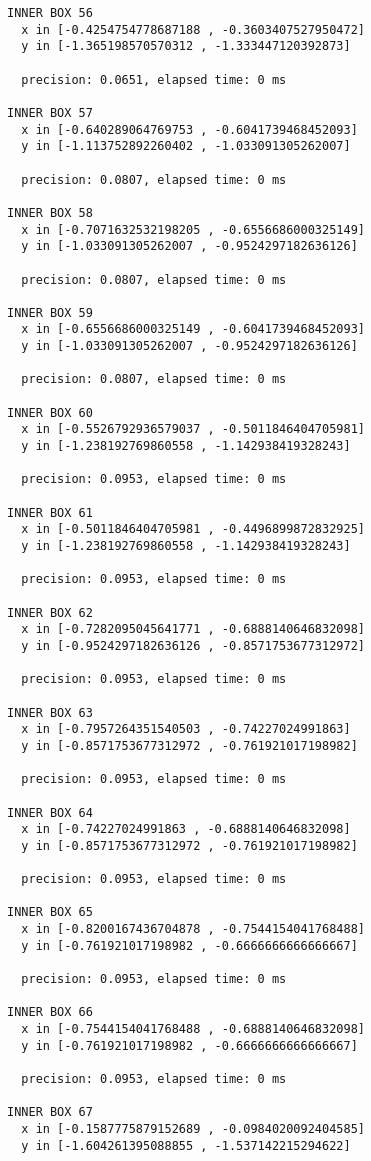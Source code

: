 \begin{verbatim}
INNER BOX 56
  x in [-0.4254754778687188 , -0.3603407527950472]
  y in [-1.365198570570312 , -1.333447120392873]

  precision: 0.0651, elapsed time: 0 ms

INNER BOX 57
  x in [-0.640289064769753 , -0.6041739468452093]
  y in [-1.113752892260402 , -1.033091305262007]

  precision: 0.0807, elapsed time: 0 ms

INNER BOX 58
  x in [-0.7071632532198205 , -0.6556686000325149]
  y in [-1.033091305262007 , -0.9524297182636126]

  precision: 0.0807, elapsed time: 0 ms

INNER BOX 59
  x in [-0.6556686000325149 , -0.6041739468452093]
  y in [-1.033091305262007 , -0.9524297182636126]

  precision: 0.0807, elapsed time: 0 ms

INNER BOX 60
  x in [-0.5526792936579037 , -0.5011846404705981]
  y in [-1.238192769860558 , -1.142938419328243]

  precision: 0.0953, elapsed time: 0 ms

INNER BOX 61
  x in [-0.5011846404705981 , -0.4496899872832925]
  y in [-1.238192769860558 , -1.142938419328243]

  precision: 0.0953, elapsed time: 0 ms

INNER BOX 62
  x in [-0.7282095045641771 , -0.6888140646832098]
  y in [-0.9524297182636126 , -0.8571753677312972]

  precision: 0.0953, elapsed time: 0 ms

INNER BOX 63
  x in [-0.7957264351540503 , -0.74227024991863]
  y in [-0.8571753677312972 , -0.761921017198982]

  precision: 0.0953, elapsed time: 0 ms

INNER BOX 64
  x in [-0.74227024991863 , -0.6888140646832098]
  y in [-0.8571753677312972 , -0.761921017198982]

  precision: 0.0953, elapsed time: 0 ms

INNER BOX 65
  x in [-0.8200167436704878 , -0.7544154041768488]
  y in [-0.761921017198982 , -0.6666666666666667]

  precision: 0.0953, elapsed time: 0 ms

INNER BOX 66
  x in [-0.7544154041768488 , -0.6888140646832098]
  y in [-0.761921017198982 , -0.6666666666666667]

  precision: 0.0953, elapsed time: 0 ms

INNER BOX 67
  x in [-0.1587775879152689 , -0.0984020092404585]
  y in [-1.604261395088855 , -1.537142215294622]


\end{verbatim}
